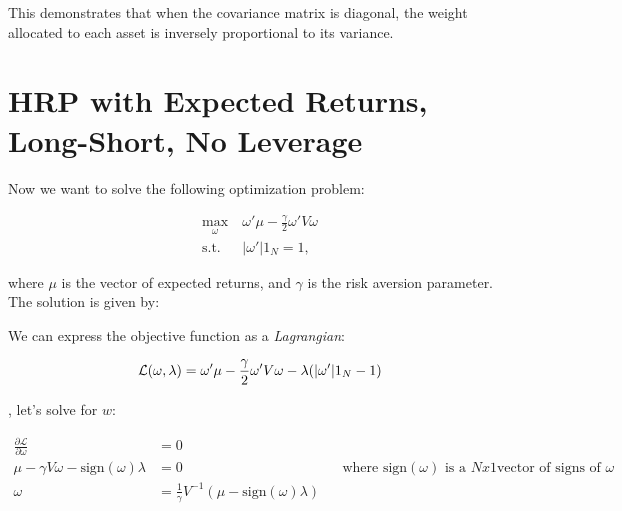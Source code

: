 \documentclass[12pt]{article}
\begin{document}
   This demonstrates that when the covariance matrix is diagonal, the weight allocated to each asset is inversely proportional to its variance.

\section*{HRP with Expected Returns, Long-Short, No Leverage}

Now we want to solve the following optimization problem:

\begin{align*}
\max_{\omega} & \ \omega' \mu - \frac{\gamma}{2} \omega' V \omega\\
\text{s.t.} & \ |\omega'| 1_N = 1, \
\end{align*}

where \( \mu \) is the vector of expected returns, and \( \gamma \) is the risk aversion parameter. The solution is given by:

We can express the objective function as a \textit{Lagrangian}:

$$
\mathcal{L}(\omega, \lambda) = \omega' \mu - \frac{\gamma}{2} \omega' V \omega - \lambda (|\omega'| 1_N - 1)\\
$$

, let's solve for $w$:

\begin{align*}
\frac{\partial \mathcal{L}}{\partial \omega}
&= 0\\
\mu - \gamma V \omega - \text{sign}(\omega) \lambda &= 0 
&& \text{where } \text{sign}(\omega) \text{ is a } Nx1 \text{vector of signs of } \omega\\
\omega &= \frac{1}{\gamma} V^{-1} (\mu - \text{sign}(\omega) \lambda)
\end{align*}
\end{document}
